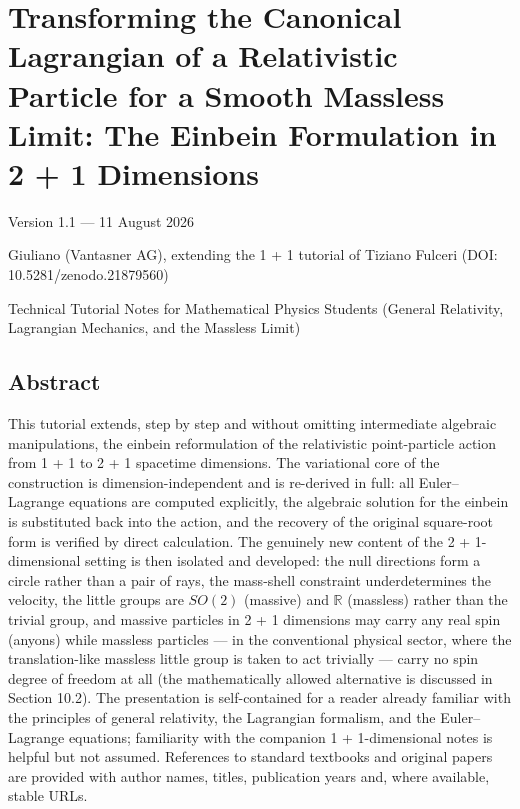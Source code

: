 \documentclass[
]{article}
\author{}
\date{}
\begin{document}
\hypertarget{transforming-the-canonical-lagrangian-of-a-relativistic-particle-for-a-smooth-massless-limit-the-einbein-formulation-in-2-1-dimensions}{%
\section{Transforming the Canonical Lagrangian of a Relativistic
Particle for a Smooth Massless Limit: The Einbein Formulation in 2 + 1
Dimensions}\label{transforming-the-canonical-lagrangian-of-a-relativistic-particle-for-a-smooth-massless-limit-the-einbein-formulation-in-2-1-dimensions}}

Version 1.1 --- 11 August 2026

Giuliano (Vantasner AG), extending the 1 + 1 tutorial of Tiziano Fulceri
(DOI: 10.5281/zenodo.21879560)

Technical Tutorial Notes for Mathematical Physics Students (General
Relativity, Lagrangian Mechanics, and the Massless Limit)

\hypertarget{abstract}{%
\subsection{Abstract}\label{abstract}}

This tutorial extends, step by step and without omitting intermediate
algebraic manipulations, the einbein reformulation of the relativistic
point-particle action from 1 + 1 to 2 + 1 spacetime dimensions. The
variational core of the construction is dimension-independent and is
re-derived in full: all Euler--Lagrange equations are computed
explicitly, the algebraic solution for the einbein is substituted back
into the action, and the recovery of the original square-root form is
verified by direct calculation. The genuinely new content of the 2 +
1-dimensional setting is then isolated and developed: the null
directions form a circle rather than a pair of rays, the mass-shell
constraint underdetermines the velocity, the little groups are \(SO(2)\)
(massive) and \(\mathbb{R}\) (massless) rather than the trivial group,
and massive particles in 2 + 1 dimensions may carry any real spin
(anyons) while massless particles --- in the conventional physical
sector, where the translation-like massless little group is taken to act
trivially --- carry no spin degree of freedom at all (the mathematically
allowed alternative is discussed in Section 10.2). The presentation is
self-contained for a reader already familiar with the principles of
general relativity, the Lagrangian formalism, and the Euler--Lagrange
equations; familiarity with the companion 1 + 1-dimensional notes is
helpful but not assumed. References to standard textbooks and original
papers are provided with author names, titles, publication years and,
where available, stable URLs.
\end{document}
